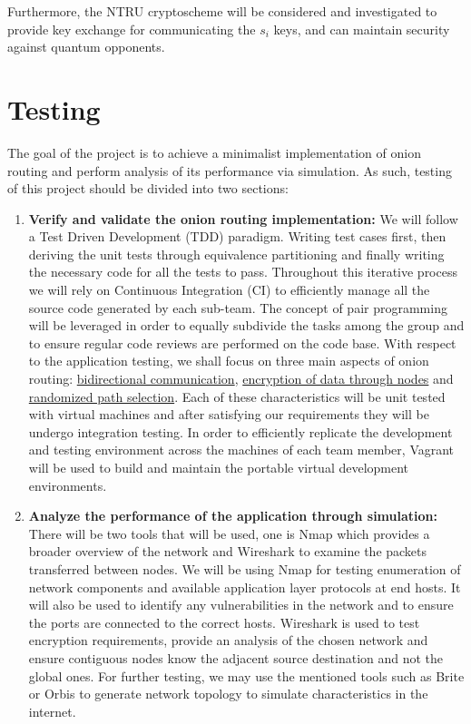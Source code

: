 \documentclass[10pt]{article}
\begin{document}
\noindent Furthermore, the NTRU cryptoscheme will be considered and investigated to
provide key exchange for communicating the $s_i$ keys, and can maintain
security against quantum opponents.


\section*{Testing}
The goal of the project is to achieve a minimalist implementation of onion
routing and perform analysis of its performance via simulation. As such,
testing of this project should be divided into two sections:
\begin{enumerate}
	\item \textbf{Verify and validate the onion routing implementation:} We
		will follow a Test Driven Development (TDD) paradigm. Writing test
		cases first, then deriving the unit tests through equivalence
		partitioning and finally writing the necessary code for all the tests
		to pass. Throughout this iterative process we will rely on Continuous
		Integration (CI) to efficiently manage all the source code generated by
		each sub-team. The concept of pair programming will be leveraged in
		order to equally subdivide the tasks among the group and to ensure
		regular code reviews are performed on the code base. With respect to
		the application testing, we shall focus on three main aspects of onion
		routing: \underline{bidirectional communication}, \underline{encryption
		of data through nodes} and \underline{randomized path selection}. Each
		of these characteristics will be unit tested with virtual machines and
		after satisfying our requirements they will be undergo integration
		testing. In order to efficiently replicate the development and testing
		environment across the machines of each team member, Vagrant will be
		used to build and maintain the portable virtual development
		environments.
	\item \textbf{Analyze the performance of the application through
		simulation:} There will be two tools that will be used, one is Nmap
		which provides a broader overview of the network and Wireshark to
		examine the packets transferred between nodes. We will be using Nmap
		for testing enumeration of network components and available application
		layer protocols at end hosts. It will also be used to identify any
		vulnerabilities in the network and to ensure the ports are connected to
		the correct hosts. Wireshark is used to test encryption requirements,
		provide an analysis of the chosen network and ensure contiguous nodes
		know the adjacent source destination and not the global ones. For
		further testing, we may use the mentioned tools such as Brite or Orbis
		to generate network topology to simulate characteristics in the
		internet.


\end{enumerate}
\end{document}
